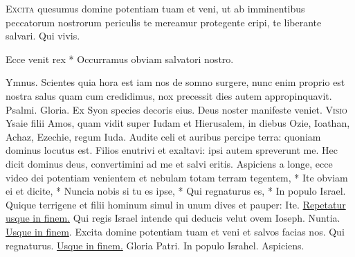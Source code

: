 \begin{multicols*}{2}
\lettrine[lines=2]{\zallmancaps \color{Blue} E}{xcita} quesumus domine potentiam tuam et veni, ut ab imminentibus peccatorum nostrorum periculis te mereamur protegente eripi, te liberante salvari. Qui vivis.
\begin{invitatory}
{Ecce venit rex * Occurramus obviam salvatori nostro.}
\end{invitatory}
{\color{Red} Ymnus.}
{}
 Scientes quia hora est iam nos de somno surgere, nunc enim proprio est nostra salus quam cum credidimus, nox precessit dies autem appropinquavit. {\color{Red} Psalmi.}
Gloria. \V Ex Syon species decoris eius. \R Deus noster manifeste veniet.
\lettrine[lines=2]{\zallmancaps \color{Blue} V}{isio} Ysaie filii Amos, quam vidit super Iudam et Hierusalem, in diebus Ozie, Ioathan, Achaz, Ezechie, regum Iuda. Audite celi et auribus percipe terra: quoniam dominus locutus est. Filios enutrivi et exaltavi: ipsi autem spreverunt me. Hec dicit dominus deus, convertimini ad me et salvi eritis.
\hypertarget{aspiciens}{\label{aspiciens}}
\newline \R Aspiciens a longe, ecce video dei potentiam venientem et nebulam totam terram tegentem, * Ite obviam ei et dicite, * Nuncia nobis si tu es ipse, * Qui regnaturus es, * In populo Israel. \V Quique terrigene et filii hominum simul in unum dives et pauper: Ite. \ul{Repetatur usque in finem.} \V Qui regis Israel intende qui deducis velut ovem Ioseph. Nuntia. \ul{Usque in finem}. \V Excita domine potentiam tuam et veni et salvos facias nos. Qui regnaturus. \ul{Usque in finem.} Gloria Patri. In populo Israhel. \R Aspiciens.

\end{multicols*}
